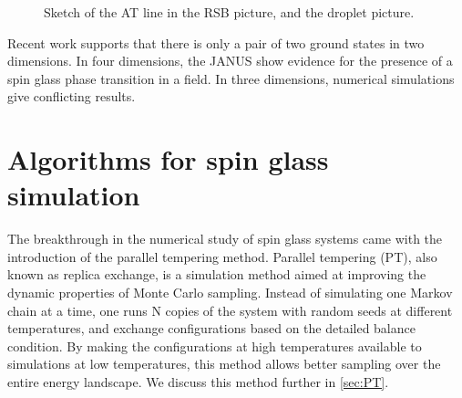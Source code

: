 \begin{figure}
  \centering
  \hspace{0.5cm}
  \caption{Sketch of the AT line in the RSB picture, and the droplet picture.}
  \label{fig:at_line}
\end{figure}

Recent work supports that there is only a pair of two ground states in two dimensions.
In four dimensions, the JANUS show evidence for the presence of a spin glass
phase transition in a field. In three dimensions, numerical simulations give 
conflicting results.


\section{Algorithms for spin glass simulation}
The breakthrough in the numerical study of spin glass systems came with the 
introduction of the parallel tempering method. Parallel tempering (PT), also known
as replica exchange, is a simulation method aimed at improving the dynamic 
properties of Monte Carlo sampling. Instead of simulating one Markov chain at 
a time, one runs N copies of the system with random seeds at different 
temperatures, and exchange configurations based on the detailed balance condition.
By making the configurations at high temperatures available to simulations at 
low temperatures, this method allows better sampling over the entire energy
landscape. We discuss this method further in \ref{sec:PT}.

